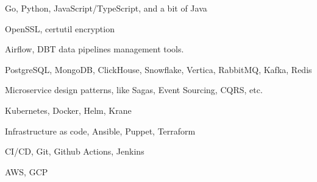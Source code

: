 \item Go, Python, JavaScript/TypeScript, and a bit of Java
\item OpenSSL, certutil encryption
\item Airflow, DBT data pipelines management tools.
\item PostgreSQL, MongoDB, ClickHouse, Snowflake, Vertica, RabbitMQ, Kafka,
  Redis
\item Microservice design patterns, like Sagas, Event Sourcing, CQRS, etc.
\item Kubernetes, Docker, Helm, Krane
\item Infrastructure as code, Ansible, Puppet, Terraform
\item CI/CD, Git, Github Actions, Jenkins
\item AWS, GCP

